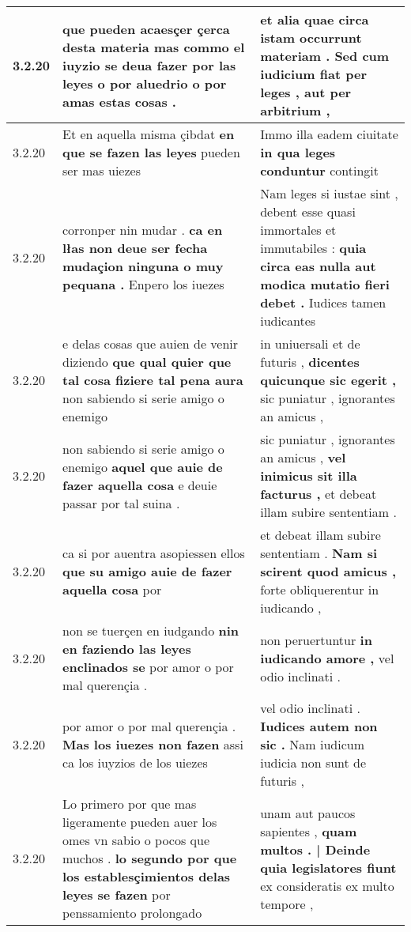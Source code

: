 \begin{tabular}{|p{1cm}|p{6.5cm}|p{6.5cm}|}
3.2.20 & que pueden acaesçer çerca desta materia \textbf{ mas commo el iuyzio se deua fazer } por las leyes o por aluedrio o por amas estas cosas . & et alia quae circa istam occurrunt materiam . \textbf{ Sed cum iudicium fiat per leges , } aut per arbitrium , \\\hline
3.2.20 & Et en aquella misma çibdat \textbf{ en que se fazen las leyes } pueden ser mas uiezes & Immo illa eadem ciuitate \textbf{ in qua leges conduntur } contingit \\\hline
3.2.20 & corronper nin mudar . \textbf{ ca en lłas non deue ser fecha mudaçion ninguna o muy pequana . } Enpero los iuezes & Nam leges si iustae sint , debent esse quasi immortales et immutabiles : \textbf{ quia circa eas nulla aut modica mutatio fieri debet . } Iudices tamen iudicantes \\\hline
3.2.20 & e delas cosas que auien de venir diziendo \textbf{ que qual quier que tal cosa fiziere tal pena aura } non sabiendo si serie amigo o enemigo & in uniuersali et de futuris , \textbf{ dicentes quicunque sic egerit , } sic puniatur , ignorantes an amicus , \\\hline
3.2.20 & non sabiendo si serie amigo o enemigo \textbf{ aquel que auie de fazer aquella cosa } e deuie passar por tal suina . & sic puniatur , ignorantes an amicus , \textbf{ vel inimicus sit illa facturus , } et debeat illam subire sententiam . \\\hline
3.2.20 & ca si por auentra asopiessen ellos \textbf{ que su amigo auie de fazer aquella cosa } por & et debeat illam subire sententiam . \textbf{ Nam si scirent quod amicus , } forte obliquerentur in iudicando , \\\hline
3.2.20 & non se tuerçen en iudgando \textbf{ nin en faziendo las leyes enclinados se } por amor o por mal querençia . & non peruertuntur \textbf{ in iudicando amore , } vel odio inclinati . \\\hline
3.2.20 & por amor o por mal querençia . \textbf{ Mas los iuezes non fazen } assi ca los iuyzios de los uiezes & vel odio inclinati . \textbf{ Iudices autem non sic . } Nam iudicum iudicia non sunt de futuris , \\\hline
3.2.20 & Lo primero por que mas ligeramente pueden auer los omes vn sabio o pocos que muchos . \textbf{ lo segundo por que los establesçimientos delas leyes se fazen } por penssamiento prolongado & unam aut paucos sapientes , \textbf{ quam multos . | Deinde quia legislatores fiunt } ex consideratis ex multo tempore , \\\hline

\end{tabular}
